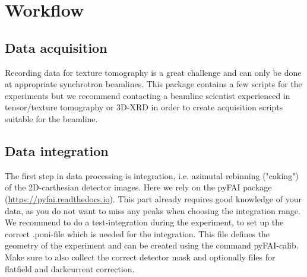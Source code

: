 \section{Workflow}

\subsection{Data acquisition}
Recording data for texture tomography is a great challenge and can only be done at appropriate synchrotron beamlines.
This package contains a few scripts for the experiments but we recommend contacting 
a beamline scientist experienced in tensor/texture tomography or 
3D-XRD in order to create acquisition scripts suitable for the beamline.

\subsection{Data integration}\label{sec:integration}
The first step in data processing is integration, i.e. azimutal rebinning ("caking") of the 2D-carthesian detector images.
Here we rely on the pyFAI package (\url{https://pyfai.readthedocs.io}).
This part already requires good knowledge of your data, as you do not want to miss any peaks when choosing the
integration range. We recommend to do a test-integration during the experiment, to set up the correct
.poni-file which is needed for the integration. This file defines the geometry of the experiment and can be
created using the command pyFAI-calib. Make sure to also collect the correct detector mask and optionally files
for flatfield and darkcurrent correction.

